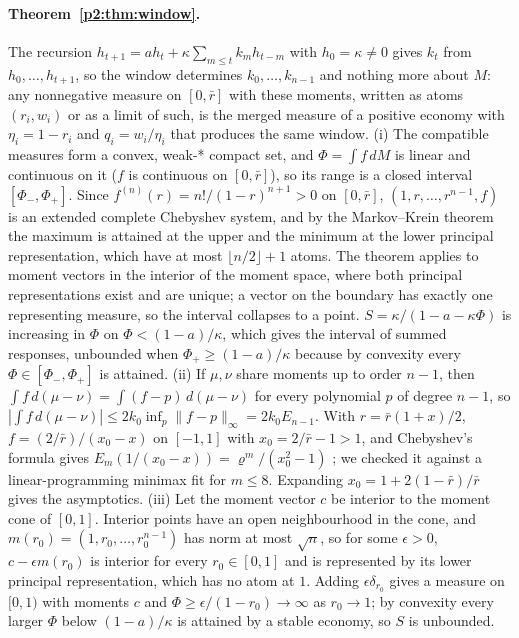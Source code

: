 \paragraph{Theorem~\ref{p2:thm:window}.} The recursion $h_{t+1}=ah_t+\kappa\sum_{m\le t}k_mh_{t-m}$ with $h_0=\kappa\neq0$ gives $k_t$ from $h_0,\ldots,h_{t+1}$, so the window determines $k_0,\ldots,k_{n-1}$ and nothing more about $M$: any nonnegative measure on $[0,\bar r]$ with these moments, written as atoms $(r_i,w_i)$ or as a limit of such, is the merged measure of a positive economy with $\eta_i=1-r_i$ and $q_i=w_i/\eta_i$ that produces the same window. (i) The compatible measures form a convex, weak-* compact set, and $\Phi=\int f\,dM$ is linear and continuous on it ($f$ is continuous on $[0,\bar r]$), so its range is a closed interval $[\Phi_-,\Phi_+]$. Since $f^{(n)}(r)=n!/(1-r)^{n+1}>0$ on $[0,\bar r]$, $(1,r,\ldots,r^{n-1},f)$ is an extended complete Chebyshev system, and by the Markov--Krein theorem \citep[Theorems IV.1.1 and IV.6.1]{p2:krein1977} the maximum is attained at the upper and the minimum at the lower principal representation, which have at most $\lfloor n/2\rfloor+1$ atoms. The theorem applies to moment vectors in the interior of the moment space, where both principal representations exist and are unique; a vector on the boundary has exactly one representing measure, so the interval collapses to a point. $S=\kappa/(1-a-\kappa\Phi)$ is increasing in $\Phi$ on $\Phi<(1-a)/\kappa$, which gives the interval of summed responses, unbounded when $\Phi_+\ge(1-a)/\kappa$ because by convexity every $\Phi\in[\Phi_-,\Phi_+]$ is attained. (ii) If $\mu,\nu$ share moments up to order $n-1$, then $\int f\,d(\mu-\nu)=\int(f-p)\,d(\mu-\nu)$ for every polynomial $p$ of degree $n-1$, so $|\int f\,d(\mu-\nu)|\le2k_0\inf_p\|f-p\|_\infty=2k_0E_{n-1}$. With $r=\bar r(1+x)/2$, $f=(2/\bar r)/(x_0-x)$ on $[-1,1]$ with $x_0=2/\bar r-1>1$, and Chebyshev's formula gives $E_m(1/(x_0-x))=\varrho^m/(x_0^2-1)$ \citep{p2:achieser1956}; we checked it against a linear-programming minimax fit for $m\le8$. Expanding $x_0=1+2(1-\bar r)/\bar r$ gives the asymptotics. (iii) Let the moment vector $c$ be interior to the moment cone of $[0,1]$. Interior points have an open neighbourhood in the cone, and $m(r_0)=(1,r_0,\ldots,r_0^{n-1})$ has norm at most $\sqrt n$, so for some $\epsilon>0$, $c-\epsilon m(r_0)$ is interior for every $r_0\in[0,1]$ and is represented by its lower principal representation, which has no atom at $1$. Adding $\epsilon\delta_{r_0}$ gives a measure on $[0,1)$ with moments $c$ and $\Phi\ge\epsilon/(1-r_0)\to\infty$ as $r_0\to1$; by convexity every larger $\Phi$ below $(1-a)/\kappa$ is attained by a stable economy, so $S$ is unbounded.

